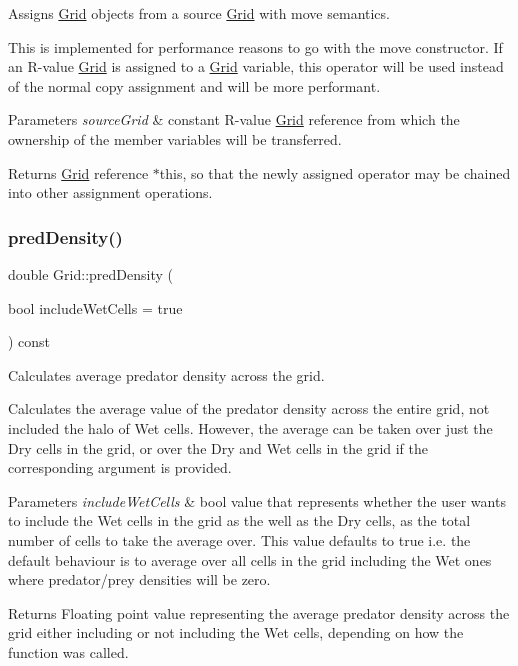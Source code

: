 Assigns \hyperlink{class_grid}{Grid} objects from a source \hyperlink{class_grid}{Grid} with move semantics. 

This is implemented for performance reasons to go with the move constructor. If an R-\/value \hyperlink{class_grid}{Grid} is assigned to a \hyperlink{class_grid}{Grid} variable, this operator will be used instead of the normal copy assignment and will be more performant.


\begin{DoxyParams}{Parameters}
{\em source\+Grid} & constant R-\/value \hyperlink{class_grid}{Grid} reference from which the ownership of the member variables will be transferred.\\
\hline
\end{DoxyParams}
\begin{DoxyReturn}{Returns}
\hyperlink{class_grid}{Grid} reference $\ast$this, so that the newly assigned operator may be chained into other assignment operations. 
\end{DoxyReturn}
\mbox{\label{class_grid_a25eeb1fef1d86fe74b45e615f0376158}} 
\subsubsection{\texorpdfstring{pred\+Density()}{predDensity()}}
{\footnotesize\ttfamily double Grid\+::pred\+Density (\begin{DoxyParamCaption}\item[{bool}]{include\+Wet\+Cells = {\ttfamily true} }\end{DoxyParamCaption}) const}



Calculates average predator density across the grid. 

Calculates the average value of the predator density across the entire grid, not included the halo of Wet cells. However, the average can be taken over just the Dry cells in the grid, or over the Dry and Wet cells in the grid if the corresponding argument is provided.


\begin{DoxyParams}{Parameters}
{\em include\+Wet\+Cells} & bool value that represents whether the user wants to include the Wet cells in the grid as the well as the Dry cells, as the total number of cells to take the average over. This value defaults to true i.\+e. the default behaviour is to average over all cells in the grid including the Wet ones where predator/prey densities will be zero.\\
\hline
\end{DoxyParams}
\begin{DoxyReturn}{Returns}
Floating point value representing the average predator density across the grid either including or not including the Wet cells, depending on how the function was called. 
\end{DoxyReturn}
\mbox{\label{class_grid_a7dc8ae18c31e8e680f6369d7c07ea881}} 
